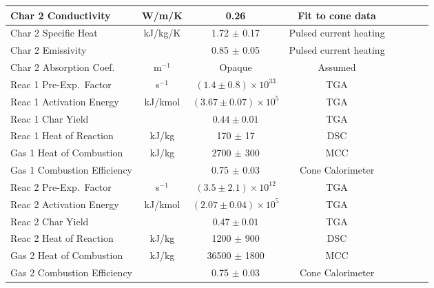 \begin{table}[h!]
\begin{center}
\begin{tabular}{|l|c|c|c|c|c|l|l|}
Char 2 Conductivity         & W/m/K         & 0.26                              & Fit to cone data          &  \cite{Stoliarov:CF2010}      \\ \hline
Char 2 Specific Heat        & kJ/kg/K       & 1.72 $\pm$ 0.17                   & Pulsed current heating    &  \cite{Stoliarov:CF2010,Matsumoto:1996}  \\ \hline
Char 2 Emissivity           &               & 0.85 $\pm$ 0.05                   & Pulsed current heating    &  \cite{Stoliarov:CF2010,Matsumoto:1996}  \\ \hline
Char 2 Absorption Coef.     & m$^{-1}$      & Opaque                            & Assumed                   &  \cite{Stoliarov:CF2010}      \\ \hline
Reac 1 Pre-Exp.~Factor      & s$^{-1}$      & $(1.4 \pm 0.8) \times 10^{33}$    & TGA                       &  \cite{Stoliarov:CF2010}      \\ \hline
Reac 1 Activation Energy    & kJ/kmol       & $(3.67 \pm 0.07) \times 10^{5}$   & TGA                       &  \cite{Stoliarov:CF2010}      \\ \hline
Reac 1 Char Yield           &               & $0.44 \pm 0.01$                   & TGA                       &  \cite{Stoliarov:CF2010}      \\ \hline
Reac 1 Heat of Reaction     & kJ/kg         & 170 $\pm$ 17                      & DSC                       &  \cite{Stoliarov:PDS2008}     \\ \hline
Gas 1 Heat of Combustion    & kJ/kg         & 2700 $\pm$ 300                    & MCC                       &  \cite{Stoliarov:CF2010}      \\ \hline
Gas 1 Combustion Efficiency &               & 0.75 $\pm$ 0.03                   & Cone Calorimeter          &  \cite{Stoliarov:CF2010}      \\ \hline
Reac 2 Pre-Exp.~Factor      & s$^{-1}$      & $(3.5 \pm 2.1) \times 10^{12}$    & TGA                       &  \cite{Stoliarov:CF2010}      \\ \hline
Reac 2 Activation Energy    & kJ/kmol       & $(2.07 \pm 0.04) \times 10^{5}$   & TGA                       &  \cite{Stoliarov:CF2010}      \\ \hline
Reac 2 Char Yield           &               & $0.47 \pm 0.01$                   & TGA                       &  \cite{Stoliarov:CF2010}      \\ \hline
Reac 2 Heat of Reaction     & kJ/kg         & 1200 $\pm$ 900                    & DSC                       &  \cite{Stoliarov:PDS2008}     \\ \hline
Gas 2 Heat of Combustion    & kJ/kg         & 36500 $\pm$ 1800                  & MCC                       &  \cite{Stoliarov:CF2010}      \\ \hline
Gas 2 Combustion Efficiency &               & 0.75 $\pm$ 0.03                   & Cone Calorimeter          &  \cite{Stoliarov:CF2010}      \\ \hline
\end{tabular}
\end{center}
\label{Properties_PVC}
\end{table}

